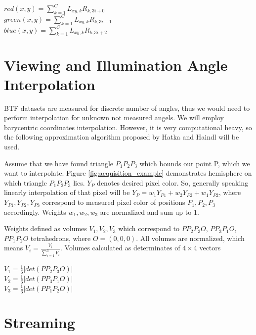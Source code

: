 {\centering $red(x,y)=\sum_{k=1}^{C}L_{xy,k}R_{k,3i+0}$ \\}
{\centering $green(x,y)=\sum_{k=1}^{C}L_{xy,k}R_{k,3i+1}$ \\}
{\centering $blue(x,y)=\sum_{k=1}^{C}L_{xy,k}R_{k,3i+2}$ \\}


\section{Viewing and Illumination Angle Interpolation}
\label{section:interpolation}

BTF datasets are measured for discrete number of angles, thus we would need to perform interpolation for unknown not measured angels.
We will employ barycentric coordinates interpolation. 
However, it is very computational heavy, so the following approximation algorithm proposed by Hatka and Haindl \cite{btfblender} will be used.

Assume that we have found triangle $P_{1}P_{2}P_{3}$ which bounds our point P, which we want to interpolate. Figure \ref{fig:acquisition_example} demonstrates hemisphere on which triangle $P_{1}P_{2}P_{3}$ lies.
$Y_{P}$ denotes desired pixel color. 
So, generally speaking linearly interpolation of that pixel will be $Y_{P}=w_{1}Y_{P1} + w_{2}Y_{P2} + w_{1}Y_{P2}$, 
where $Y_{P1},Y_{P2},Y_{P3}$ correspond to measured pixel color of positions $P_{1},P_{2},P_{3}$ accordingly. Weights $w_{1},w_{2},w_{3}$ are normalized and sum up to $1$.

Weights defined as volumes $V_{1},V_{2},V_{3}$ which correspond to $PP_{2}P_{3}O$, $PP_{3}P_{1}O$, $PP_{1}P_{2}O$ tetrahedrons, where $O=(0,0,0)$.
All volumes are normalized, which means $V_{i}=\frac{V_{i}}{\sum_{i=1}^{3}V_{i}}$. Volumes calculated as determinates of $4\times 4$ vectors

{\centering $V_{1}=\frac{1}{6}\left | det(PP_{2}P_{3}O) \right |$ \\}
{\centering $V_{2}=\frac{1}{6}\left | det(PP_{3}P_{1}O) \right |$ \\}
{\centering $V_{3}=\frac{1}{6}\left | det(PP_{1}P_{2}O) \right |$ \\}

\section{Streaming}
\label{section:streaming}



